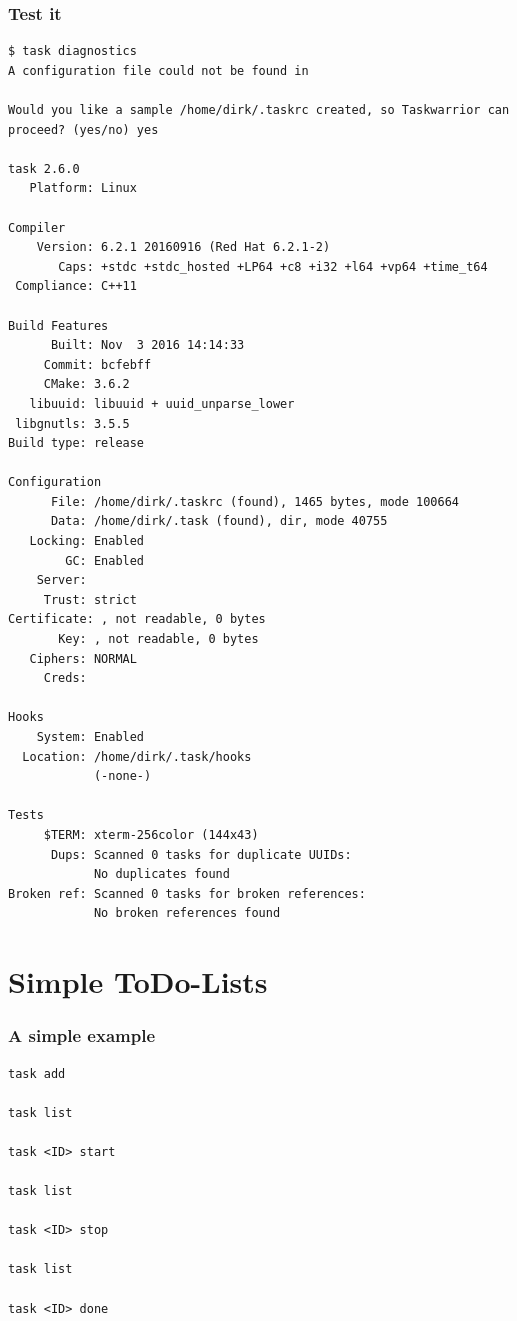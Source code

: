 \documentclass[t,handout]{beamer}
\begin{document}
\begin{frame}[fragile]\frametitle{Test it}
    \vfill
    \begin{lstlisting}
$ task diagnostics
A configuration file could not be found in

Would you like a sample /home/dirk/.taskrc created, so Taskwarrior can proceed? (yes/no) yes

task 2.6.0
   Platform: Linux

Compiler
    Version: 6.2.1 20160916 (Red Hat 6.2.1-2)
       Caps: +stdc +stdc_hosted +LP64 +c8 +i32 +l64 +vp64 +time_t64
 Compliance: C++11

Build Features
      Built: Nov  3 2016 14:14:33
     Commit: bcfebff
     CMake: 3.6.2
   libuuid: libuuid + uuid_unparse_lower
 libgnutls: 3.5.5
Build type: release

Configuration
      File: /home/dirk/.taskrc (found), 1465 bytes, mode 100664
      Data: /home/dirk/.task (found), dir, mode 40755
   Locking: Enabled
        GC: Enabled
    Server:
     Trust: strict
Certificate: , not readable, 0 bytes
       Key: , not readable, 0 bytes
   Ciphers: NORMAL
     Creds:

Hooks
    System: Enabled
  Location: /home/dirk/.task/hooks
            (-none-)

Tests
     $TERM: xterm-256color (144x43)
      Dups: Scanned 0 tasks for duplicate UUIDs:
            No duplicates found
Broken ref: Scanned 0 tasks for broken references:
            No broken references found\end{lstlisting}
\end{frame}

\section{Simple ToDo-Lists}

\begin{frame}[fragile]\frametitle{A simple example}
    \vfill
    \begin{lstlisting}
task add

task list

task <ID> start

task list

task <ID> stop

task list

task <ID> done\end{lstlisting}
\end{frame}
\end{document}
